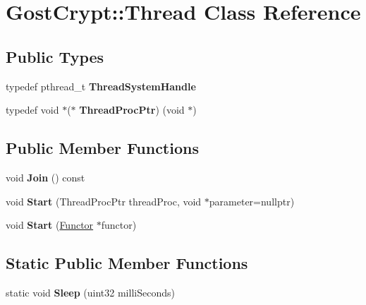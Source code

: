 \hypertarget{class_gost_crypt_1_1_thread}{}\section{Gost\+Crypt\+:\+:Thread Class Reference}
\label{class_gost_crypt_1_1_thread}
\subsection*{Public Types}
\begin{DoxyCompactItemize}
\item 
\mbox{\label{class_gost_crypt_1_1_thread_a142e065bd8973b6551dd4a16ee9e43b4}} 
typedef pthread\+\_\+t {\bfseries Thread\+System\+Handle}
\item 
\mbox{\label{class_gost_crypt_1_1_thread_a48b14b06eb97668278751efec2457dd5}} 
typedef void $\ast$($\ast$ {\bfseries Thread\+Proc\+Ptr}) (void $\ast$)
\end{DoxyCompactItemize}
\subsection*{Public Member Functions}
\begin{DoxyCompactItemize}
\item 
\mbox{\label{class_gost_crypt_1_1_thread_aaf1fc08df430bcc3e69e546de342378d}} 
void {\bfseries Join} () const
\item 
\mbox{\label{class_gost_crypt_1_1_thread_acdc07b908ae3af13a5de5ff77ce7c5fb}} 
void {\bfseries Start} (Thread\+Proc\+Ptr thread\+Proc, void $\ast$parameter=nullptr)
\item 
\mbox{\label{class_gost_crypt_1_1_thread_a0e4a44e99e16e4d7203ec1cd30ca4f9e}} 
void {\bfseries Start} (\hyperlink{struct_gost_crypt_1_1_functor}{Functor} $\ast$functor)
\end{DoxyCompactItemize}
\subsection*{Static Public Member Functions}
\begin{DoxyCompactItemize}
\item 
\mbox{\label{class_gost_crypt_1_1_thread_ad54eb19436581cb6b2ea59136ffa5858}} 
static void {\bfseries Sleep} (uint32 milli\+Seconds)
\end{DoxyCompactItemize}
